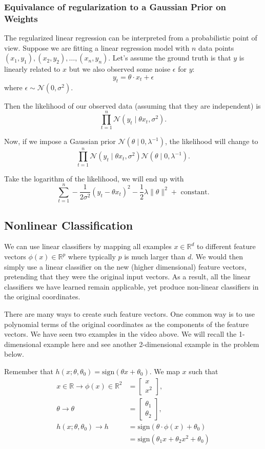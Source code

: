 \documentclass{article}
\begin{document}
\subsubsection{Equivalance of regularization to a Gaussian Prior on Weights}
The regularized linear regression can be interpreted from a probabilistic point of view. Suppose we are fitting a linear regression model with $n$ data points $(x_1,y_1),(x_2,y_2),\ldots,(x_n,y_n)$. Let's assume the ground truth is that $y$ is linearly related to $x$ but we also observed some noise $\epsilon$ for $y$:
\[y_t=\theta\cdot x_t+\epsilon\] where $\epsilon\sim\mathcal{N}(0,\sigma^2)$.


Then the likelihood of our observed data (assuming that they are independent) is 
\[\prod_{t=1}^n\mathcal{N}(y_t\mid\theta x_t,\sigma^2).\]

Now, if we impose a Gaussian prior $\mathcal{N}(\theta\mid 0,\lambda^{-1})$, the likelihood will change to 
\[\prod_{t=1}^n\mathcal{N}(y_t\mid\theta x_t,\sigma^2)\mathcal{N}(\theta\mid 0,\lambda^{-1}).\]


Take the logarithm of the likelihood, we will end up with 
\[\sum\limits_{t=1}^n-\frac{1}{2\sigma^2}(y_t-\theta x_t)^2-\frac{1}{2}\lambda\lVert\theta\rVert^2+\text{ constant}.\]

\subsection{Nonlinear Classification}

We can use linear classifiers by mapping all examples $x\in\mathbb{R}^d$ to different feature vectors $\phi(x)\in\mathbb{R}^p$ where typically $p$ is much larger than $d$. We would then simply use a linear classifier on the new (higher dimensional) feature vectors, pretending that they were the original input vectors. As a result, all the linear classifiers we have learned remain applicable, yet produce non-linear classifiers in the original coordinates.


There are many ways to create such feature vectors. One common way is to use polynomial terms of the original coordinates as the components of the feature vectors. We have seen two examples in the video above. We will recall the 1-dimensional example here and see another 2-dimensional example in the problem below.

Remember that $h(x;\theta,\theta_0)=\text{sign}(\theta x+\theta_0)$. We map $x$ such that
\begin{align*}x\in\mathbb{R}\rightarrow\phi(x)\in\mathbb{R}^2&=\begin{bmatrix}x\\x^2\end{bmatrix},
	\\\theta\rightarrow\theta&=\begin{bmatrix}\theta_1\\\theta_2\end{bmatrix},\\
		h(x;\theta,\theta_0)\rightarrow h&=\text{sign}(\theta\cdot\phi(x)+\theta_0)\\
	&=\text{sign}(\theta_1 x+\theta_2 x^2+\theta_0)
\end{align*}
\end{document}
